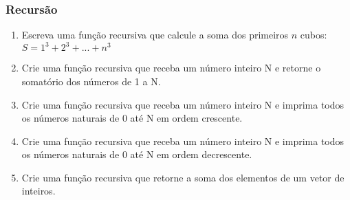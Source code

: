 \documentclass[a4paper,12pt]{article}
\begin{document}
\subsubsection{Recursão}

\begin{enumerate}
  \item Escreva uma função recursiva que calcule a soma dos primeiros $n$ cubos: $S = 1^3 + 2^3 + ... + n^3$
  \item Crie uma função recursiva que receba um número inteiro N e retorne o somatório dos números de 1 a N.
  \item Crie uma função recursiva que receba um número inteiro N e imprima todos os números naturais de 0 até N em ordem crescente.
  \item Crie uma função recursiva que receba um número inteiro N e imprima todos os números naturais de 0 até N em ordem decrescente.
  \item Crie uma função recursiva que retorne a soma dos elementos de um vetor de inteiros.
\end{enumerate}
\end{document}
